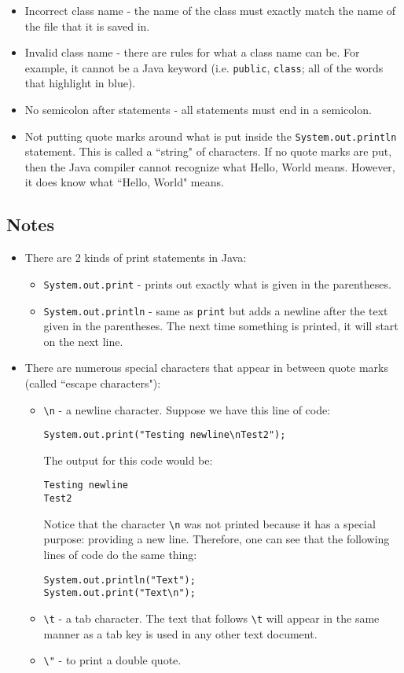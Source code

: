 \begin{itemize}
\item Incorrect class name - the name of the class must exactly match the name of the file that it is saved in. 
\item Invalid class name - there are rules for what a class name can be. For example, it cannot be a Java keyword (i.e. \texttt{public}, \texttt{class}; all of the words that highlight in blue).
\item No semicolon after statements - all statements must end in a semicolon.
\item Not putting quote marks around what is put inside the \texttt{System.out.println} statement. This is called a ``string" of characters. If no quote marks are put, then the Java compiler cannot recognize what Hello, World means. However, it does know what ``Hello, World" means.  
\end{itemize}

\subsection{Notes}
\begin{itemize}
\item There are 2 kinds of print statements in Java:
\begin{itemize}
\item \verb|System.out.print| - prints out exactly what is given in the parentheses.
\item \verb|System.out.println| - same as \verb|print| but adds a newline after the text given in the parentheses. The next time something is printed, it will start on the next line.
\end{itemize}

\item There are numerous special characters that appear in between quote marks (called ``escape characters"):
\begin{itemize}
\item \verb|\n| - a newline character. Suppose we have this line of code:
\begin{lstlisting}
System.out.print("Testing newline\nTest2");
\end{lstlisting}
The output for this code would be:
\begin{verbatim}
Testing newline
Test2
\end{verbatim}
Notice that the character \verb|\n| was not printed because it has a special purpose: providing a new line. Therefore, one can see that the following lines of code do the same thing:
\begin{verbatim}
System.out.println("Text");
System.out.print("Text\n");
\end{verbatim}
\item \verb|\t| - a tab character. The text that follows \verb|\t| will appear in the same manner as a tab key is used in any other text document.
\item \verb|\"| - to print a double quote.
\end{itemize}
\end{itemize}

